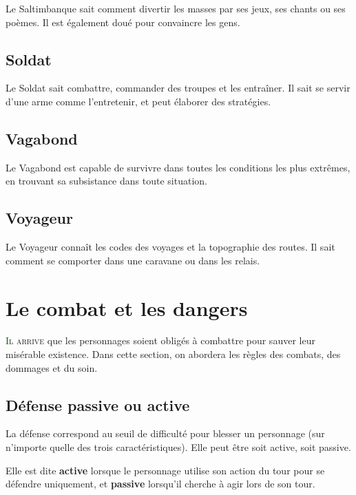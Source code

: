 Le Saltimbanque sait comment divertir les masses par ses jeux, ses chants ou ses poèmes. Il est également doué pour convaincre les gens.

\subsection*{Soldat}

Le Soldat sait combattre, commander des troupes et les entraîner. Il sait se servir d'une arme comme l'entretenir, et peut élaborer des stratégies.

\subsection*{Vagabond}

Le Vagabond est capable de survivre dans toutes les conditions les plus extrêmes, en trouvant sa subsistance dans toute situation.

\subsection*{Voyageur}

Le Voyageur connaît les codes des voyages et la topographie des routes. Il sait comment se comporter dans une caravane ou dans les relais.

\newpage

\section{Le combat et les dangers}

\lettrine[lines=3]{\initfamily\textcolor{darkgreen}{I}}{l arrive} que les personnages soient obligés à combattre pour sauver leur misérable existence. Dans cette section, on abordera les règles des combats, des dommages et du soin.

\subsection{Défense passive ou active}

La défense correspond au seuil de difficulté pour blesser un personnage (sur n'importe quelle des trois caractéristiques). Elle peut être soit active, soit passive.

Elle est dite \textbf{active} lorsque le personnage utilise son action du tour pour se défendre uniquement, et \textbf{passive} lorsqu'il cherche à agir lors de son tour.

